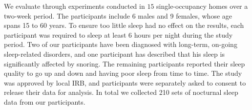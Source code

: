 We evaluate \systemname through experiments conducted in $15$ single-occupancy homes over a two-week period.  The participants include 6 males and 9 females, whose age spans 15 to 60 years. To ensure too little sleep had no effect on the results, each participant was required to sleep at least $6$ hours per night during the study period. Two of our participants have been diagnosed with long-term, on-going sleep-related disorders, and one participant has described that his sleep is significantly affected by snoring. The remaining participants reported their sleep quality to go up and down and having poor sleep from time to time. The study was approved by local IRB, and participants were separately asked to consent to release their data for analysis. In total we collected 210 sets of nocturnal sleep data from our participants. %

